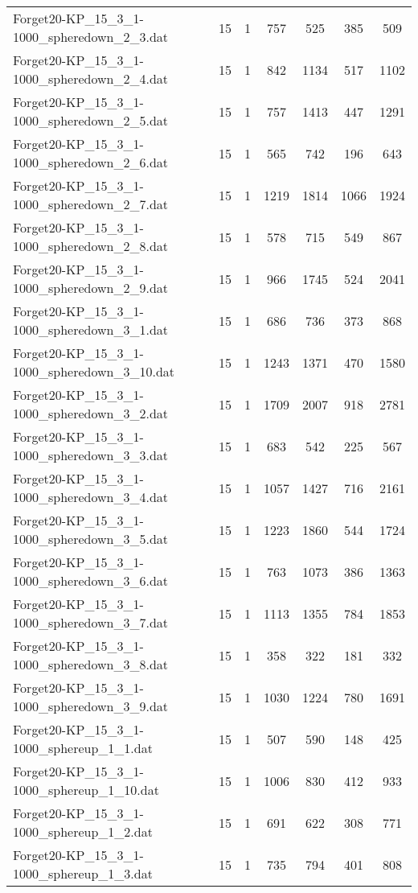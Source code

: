 \begin{table}[!ht]
\begin{tabular}{lcccccc}
Forget20-KP\_15\_3\_1-1000\_spheredown\_2\_3.dat & 15 & 1 & 757 & 525 & 385 & 509 \\
Forget20-KP\_15\_3\_1-1000\_spheredown\_2\_4.dat & 15 & 1 & 842 & 1134 & 517 & 1102 \\
Forget20-KP\_15\_3\_1-1000\_spheredown\_2\_5.dat & 15 & 1 & 757 & 1413 & 447 & 1291 \\
Forget20-KP\_15\_3\_1-1000\_spheredown\_2\_6.dat & 15 & 1 & 565 & 742 & 196 & 643 \\
Forget20-KP\_15\_3\_1-1000\_spheredown\_2\_7.dat & 15 & 1 & 1219 & 1814 & 1066 & 1924 \\
Forget20-KP\_15\_3\_1-1000\_spheredown\_2\_8.dat & 15 & 1 & 578 & 715 & 549 & 867 \\
Forget20-KP\_15\_3\_1-1000\_spheredown\_2\_9.dat & 15 & 1 & 966 & 1745 & 524 & 2041 \\
Forget20-KP\_15\_3\_1-1000\_spheredown\_3\_1.dat & 15 & 1 & 686 & 736 & 373 & 868 \\
Forget20-KP\_15\_3\_1-1000\_spheredown\_3\_10.dat & 15 & 1 & 1243 & 1371 & 470 & 1580 \\
Forget20-KP\_15\_3\_1-1000\_spheredown\_3\_2.dat & 15 & 1 & 1709 & 2007 & 918 & 2781 \\
Forget20-KP\_15\_3\_1-1000\_spheredown\_3\_3.dat & 15 & 1 & 683 & 542 & 225 & 567 \\
Forget20-KP\_15\_3\_1-1000\_spheredown\_3\_4.dat & 15 & 1 & 1057 & 1427 & 716 & 2161 \\
Forget20-KP\_15\_3\_1-1000\_spheredown\_3\_5.dat & 15 & 1 & 1223 & 1860 & 544 & 1724 \\
Forget20-KP\_15\_3\_1-1000\_spheredown\_3\_6.dat & 15 & 1 & 763 & 1073 & 386 & 1363 \\
Forget20-KP\_15\_3\_1-1000\_spheredown\_3\_7.dat & 15 & 1 & 1113 & 1355 & 784 & 1853 \\
Forget20-KP\_15\_3\_1-1000\_spheredown\_3\_8.dat & 15 & 1 & 358 & 322 & 181 & 332 \\
Forget20-KP\_15\_3\_1-1000\_spheredown\_3\_9.dat & 15 & 1 & 1030 & 1224 & 780 & 1691 \\
Forget20-KP\_15\_3\_1-1000\_sphereup\_1\_1.dat & 15 & 1 & 507 & 590 & 148 & 425 \\
Forget20-KP\_15\_3\_1-1000\_sphereup\_1\_10.dat & 15 & 1 & 1006 & 830 & 412 & 933 \\
Forget20-KP\_15\_3\_1-1000\_sphereup\_1\_2.dat & 15 & 1 & 691 & 622 & 308 & 771 \\
Forget20-KP\_15\_3\_1-1000\_sphereup\_1\_3.dat & 15 & 1 & 735 & 794 & 401 & 808 \\

\end{tabular}
\end{table}
